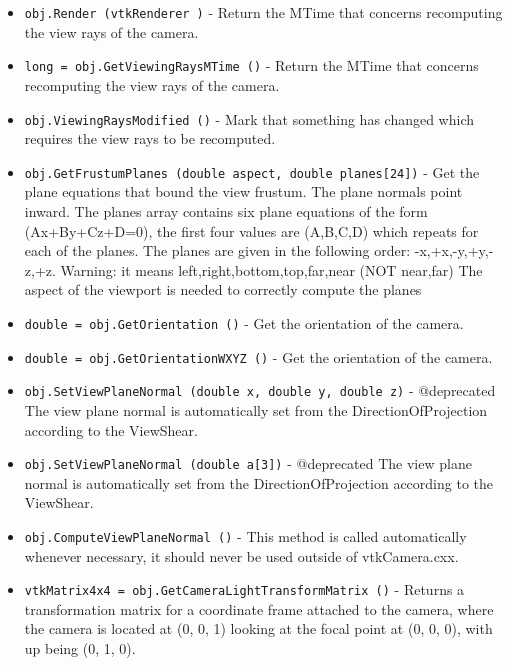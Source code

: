 \begin{itemize}
\item  \verb|obj.Render (vtkRenderer )| -  Return the MTime that concerns recomputing the view rays of the camera.

\item  \verb|long = obj.GetViewingRaysMTime ()| -  Return the MTime that concerns recomputing the view rays of the camera.

\item  \verb|obj.ViewingRaysModified ()| -  Mark that something has changed which requires the view rays
 to be recomputed.

\item  \verb|obj.GetFrustumPlanes (double aspect, double planes[24])| -  Get the plane equations that bound the view frustum.
 The plane normals point inward. The planes array contains six
 plane equations of the form (Ax+By+Cz+D=0), the first four
 values are (A,B,C,D) which repeats for each of the planes.
 The planes are given in the following order: -x,+x,-y,+y,-z,+z.
 Warning: it means left,right,bottom,top,far,near (NOT near,far)
 The aspect of the viewport is needed to correctly compute the planes

\item  \verb|double = obj.GetOrientation ()| -  Get the orientation of the camera.

\item  \verb|double = obj.GetOrientationWXYZ ()| -  Get the orientation of the camera.

\item  \verb|obj.SetViewPlaneNormal (double x, double y, double z)| -  @deprecated The view plane normal is automatically set from the
 DirectionOfProjection according to the ViewShear.

\item  \verb|obj.SetViewPlaneNormal (double a[3])| -  @deprecated The view plane normal is automatically set from the
 DirectionOfProjection according to the ViewShear.

\item  \verb|obj.ComputeViewPlaneNormal ()| -  This method is called automatically whenever necessary, it
 should never be used outside of vtkCamera.cxx.

\item  \verb|vtkMatrix4x4 = obj.GetCameraLightTransformMatrix ()| -  Returns a transformation matrix for a coordinate frame attached to
 the camera, where the camera is located at (0, 0, 1) looking at the
 focal point at (0, 0, 0), with up being (0, 1, 0).


\end{itemize}
